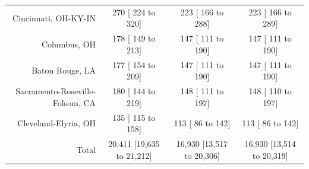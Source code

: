 \documentclass{article}
\begin{document}
\begin{table}[H]
\begin{tabular}{|r|c|c|c|}
		Cincinnati, OH-KY-IN &    270 [   224 to    320] &    223 [   166 to    288] &    223 [   166 to    289]\\
		Columbus, OH &    178 [   149 to    213] &    147 [   111 to    190] &    147 [   111 to    190]\\
		Baton Rouge, LA &    177 [   154 to    209] &    147 [   111 to    190] &    147 [   111 to    190]\\
		Sacramento-Roseville-Folsom, CA &    180 [   144 to    219] &    148 [   111 to    197] &    148 [   110 to    197]\\
		Cleveland-Elyria, OH &    135 [   115 to    158] &    113 [    86 to    142] &    113 [    86 to    142]\\
		\hline
		Total & 20,411 [19,635 to 21,212] & 16,930 [13,517 to 20,306] & 16,930 [13,514 to 20,319]\\
		\hline
	\end{tabular}
\end{table}
\end{document}
